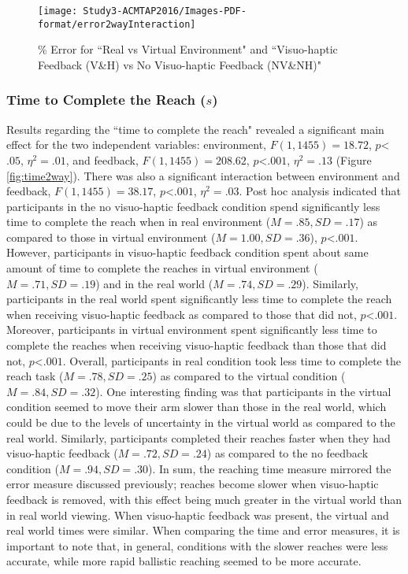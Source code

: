 \begin{figure}
	\centering
	\texttt{[image: Study3-ACMTAP2016/Images-PDF-format/error2wayInteraction]}
	\caption{\% Error for ``Real vs Virtual Environment" and ``Visuo-haptic Feedback (V\&H) vs No Visuo-haptic Feedback (NV\&NH)"}
	\label{fig:error2way}
\end{figure}

\subsubsection{Time to Complete the Reach ($s$)} \label{time2way}
Results regarding the ``time to complete the reach" revealed a significant main effect for the two independent variables: environment, $F(1,1455)=18.72$, $p$\textless$.05$, $\eta^{2}=.01$, and feedback, $F(1,1455)=208.62$, $p$\textless$.001$, $\eta^{2}=.13$ (Figure \ref{fig:time2way}). There was also a significant interaction between environment and feedback, $F(1,1455)=38.17$, $p$\textless$.001$, $\eta^{2}=.03$. Post hoc analysis indicated that participants in the no visuo-haptic feedback condition spend significantly less time to complete the reach when in real environment ($M=.85, SD=.17$) as compared to those in virtual environment ($M=1.00, SD=.36$), $p$\textless$.001$. However, participants in visuo-haptic feedback condition spent about same amount of time to complete the reaches in virtual environment ($M=.71, SD=.19$) and in the real world ($M=.74, SD=.29$). Similarly, participants in the real world spent significantly less time to complete the reach when receiving visuo-haptic feedback as compared to those that did not, $p$\textless$.001$. Moreover, participants in virtual environment spent significantly less time to complete the reaches when receiving visuo-haptic feedback than those that did not, $p$\textless$.001$. Overall, participants in real condition took less time to complete the reach task ($M=.78, SD=.25$) as compared to the virtual condition ($M=.84, SD=.32$). One interesting finding was that participants in the virtual condition seemed to move their arm slower than those in the real world, which could be due to the levels of uncertainty in the virtual world as compared to the real world. Similarly, participants completed their reaches faster when they had visuo-haptic feedback ($M=.72, SD=.24$) as compared to the no feedback condition ($M=.94, SD=.30$). In sum, the reaching time measure mirrored the error measure discussed previously; reaches become slower when visuo-haptic feedback is removed, with this effect being much greater in the virtual world than in real world viewing. When visuo-haptic feedback was present, the virtual and real world times were similar. When comparing the time and error measures, it is important to note that, in general, conditions with the slower reaches were less accurate, while more rapid ballistic reaching seemed to be more accurate. 


